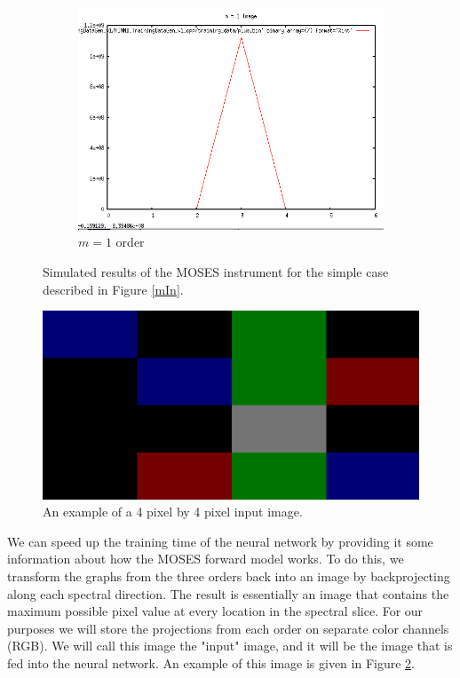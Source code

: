 \documentclass[twoside]{article}
\begin{document}
\begin{multicols}{2}
\begin{figure}
\begin{subfigure}[b]{0.3\textwidth}
            \includegraphics[width=\textwidth]{images/m1}
            \caption{$m = 1$ order }
        \end{subfigure}
 
     \caption{Simulated results of the MOSES instrument for the simple case described in Figure \ref{mIn}.}
     \label{m1-1}
 \end{figure}

\begin{figure}[H]   
	\centering
	\includegraphics[width=0.75\linewidth]{images/mOut}
	\caption{An example of a 4 pixel by 4 pixel input image.}
	\label{mOut}
\end{figure}

We can speed up the training time of the neural network by providing it some information about how the MOSES forward model works. To do this, we transform the graphs from the three orders back into an image by backprojecting along each spectral direction. The result is essentially an image that contains the maximum possible pixel value at every location in the spectral slice. For our purposes we will store the projections from each order on separate color channels (RGB). We will call this image the "input" image, and it will be the image that is fed into the neural network. An example of this image is given in Figure \ref{mOut}.

\end{multicols}
\end{document}
